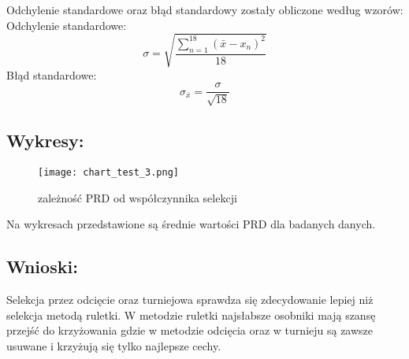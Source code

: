   \newline
    Odchylenie standardowe oraz błąd standardowy zostały obliczone według wzorów: \\
    Odchylenie standardowe:
    \[ \sigma = \sqrt{\frac{\sum_{n = 1}^{18}(\bar{x} - x_n)^2}{18}} \]
    Błąd standardowe:
    \[ \sigma_{\bar{x}} = \frac{\sigma}{\sqrt{18}} \]

  \subsection{Wykresy: }
    \begin{figure}[H]
      \texttt{[image: chart\_test\_3.png]}
      \centering
      \caption{zależność PRD od współczynnika selekcji}
    \end{figure}
  
    Na wykresach przedstawione są średnie wartości PRD dla badanych danych.
  \subsection{Wnioski: }
  Selekcja przez odcięcie oraz turniejowa sprawdza się zdecydowanie lepiej niż selekcja metodą ruletki. W metodzie ruletki najsłabsze osobniki mają szansę przejść do krzyżowania gdzie w metodzie odcięcia oraz w turnieju są zawsze usuwane i krzyżują się tylko najlepsze cechy.
